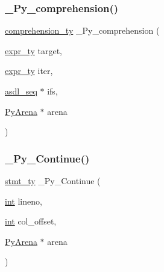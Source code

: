 \mbox{\label{_python-ast_8h_a749cdb84b4a563d8059c4b33df52c791}} 
\subsubsection{\texorpdfstring{\_Py\_comprehension()}{\_Py\_comprehension()}}
{\footnotesize\ttfamily \mbox{\hyperlink{_python-ast_8h_a465095ed82e25892d2ed2515ddfce38d}{comprehension\+\_\+ty}} \+\_\+\+Py\+\_\+comprehension (\begin{DoxyParamCaption}\item[{\mbox{\hyperlink{_python-ast_8h_a56d3705e020a071405094a220c4592bd}{expr\+\_\+ty}}}]{target,  }\item[{\mbox{\hyperlink{_python-ast_8h_a56d3705e020a071405094a220c4592bd}{expr\+\_\+ty}}}]{iter,  }\item[{\mbox{\hyperlink{structasdl__seq}{asdl\+\_\+seq}} $\ast$}]{ifs,  }\item[{\mbox{\hyperlink{pyarena_8h_a9edeb357fbb27333471022a0975adb7a}{Py\+Arena}} $\ast$}]{arena }\end{DoxyParamCaption})}

\mbox{\label{_python-ast_8h_a135a80565203c375f54525ca9b46bbc8}} 
\subsubsection{\texorpdfstring{\_Py\_Continue()}{\_Py\_Continue()}}
{\footnotesize\ttfamily \mbox{\hyperlink{_python-ast_8h_a39618071027b661bc03e8916e664e1a7}{stmt\+\_\+ty}} \+\_\+\+Py\+\_\+\+Continue (\begin{DoxyParamCaption}\item[{\mbox{\hyperlink{warnings_8h_a74f207b5aa4ba51c3a2ad59b219a423b}{int}}}]{lineno,  }\item[{\mbox{\hyperlink{warnings_8h_a74f207b5aa4ba51c3a2ad59b219a423b}{int}}}]{col\+\_\+offset,  }\item[{\mbox{\hyperlink{pyarena_8h_a9edeb357fbb27333471022a0975adb7a}{Py\+Arena}} $\ast$}]{arena }\end{DoxyParamCaption})}

\mbox{\label{_python-ast_8h_ad988aab3b2734705a19dcf45a0b98950}} 
